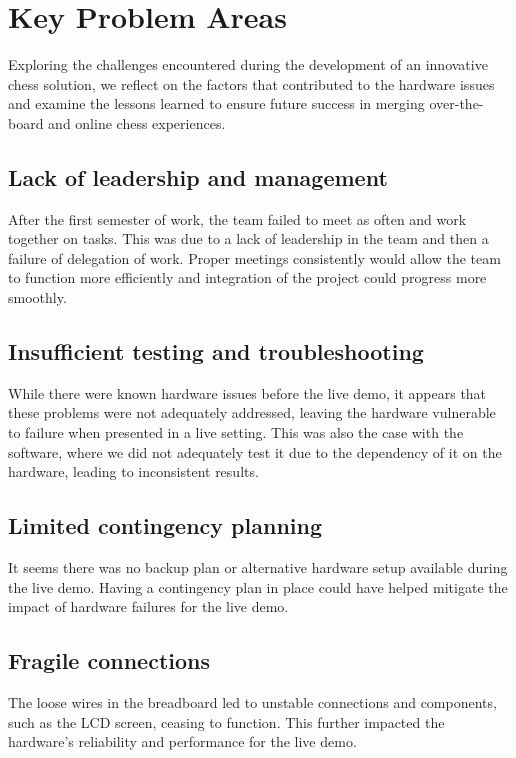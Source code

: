 \documentclass{article}
\begin{document}
\section{Key Problem Areas}
 
Exploring the challenges encountered during the development of an innovative chess solution, we reflect on the factors that contributed to the hardware issues and examine the lessons learned to ensure future success in merging over-the-board and online chess experiences.

\subsection{Lack of leadership and management} 
After the first semester of work, the team failed to meet as often and work together on tasks. 
This was due to a lack of leadership in the team and then a failure of delegation of work. 
Proper meetings consistently would allow the team to function more efficiently and integration
of the project could progress more smoothly. 

\subsection{Insufficient testing and troubleshooting}
While there were known hardware issues before the live demo, it appears that these problems were not adequately addressed, leaving the hardware vulnerable to failure when presented in a live setting.
This was also the case with the software, where we did not adequately test it due to the dependency of it on the hardware, leading to inconsistent results.

\subsection{Limited contingency planning}
It seems there was no backup plan or alternative hardware setup available during the live demo. Having a contingency plan in place could have helped mitigate the impact of hardware failures for the live demo.

\subsection{Fragile connections}
The loose wires in the breadboard led to unstable connections and components, such as the LCD screen, ceasing to function. This further impacted the hardware's reliability and performance for the live demo.
\end{document}
